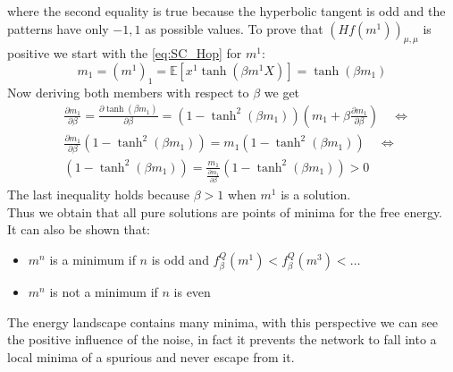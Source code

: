 where the second equality is true because the hyperbolic tangent is odd and the patterns have only $-1,1$ as possible values.
To prove that $(Hf(m^1))_{\mu,\mu}$ is positive we start with the \cref{eq:SC_Hop} for $m^1$:
    \[
            m_1 = (m^1)_1 =\mathbb{E} \left[x^1  \tanh\left( \beta m^1 X \right)  \right] = \tanh(\beta m_1)
    \]
Now deriving both members with respect to $\beta$ we get
\begin{align*}
    &\frac{\partial m_1}{\partial \beta} = \frac{\partial \tanh(\beta m_1)}{\partial \beta} = \left(1 - \tanh^2\left(\beta m_1\right)\right)\left(m_1 + \beta \frac{\partial m_1}{\partial \beta}\right) \quad \iff \\
    & \frac{\partial m_1}{\partial \beta}\left(1 - \tanh^2\left(\beta m_1\right)\right) = m_1 \left(1 - \tanh^2\left(\beta m_1\right)\right) \quad \iff \\
    & \left(1 - \tanh^2\left(\beta m_1\right)\right) =   \frac{m_1}{\frac{\partial m_1}{\partial \beta}} \left(1 - \tanh^2\left(\beta m_1\right)\right) > 0
\end{align*}
The last inequality holds because $\beta > 1$ when $m^1$ is a solution.\\
Thus we obtain that all pure solutions are points of minima for the free energy.\\
It can also be shown that:
\begin{itemize}
    \item $m^n$ is a minimum if $n$ is odd and $f^Q_\beta\left(m^1\right) < f^Q_\beta\left(m^3\right)<\ldots$
    \item $m^n$ is not a minimum if $n$ is even
\end{itemize}
The energy landscape contains many minima, with this perspective we can see the positive influence of the noise, in fact it prevents the network to fall into a local minima of a spurious and never escape from it. \\
